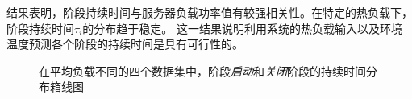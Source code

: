 结果表明，阶段持续时间与服务器负载功率值有较强相关性。在特定的热负载下，阶段持续时间${\tau}_{i}$的分布趋于稳定。
这一结果说明利用系统的热负载输入以及环境温度预测各个阶段的持续时间是具有可行性的。
\begin{figure}
\centering
\hspace{-0.1in}
\hspace{-0.05in}
\caption{
在平均负载不同的四个数据集中，阶段\textit{启动}和\textit{关闭}阶段的持续时间分布箱线图
} %
\label{fig:state}  %
\end{figure}

